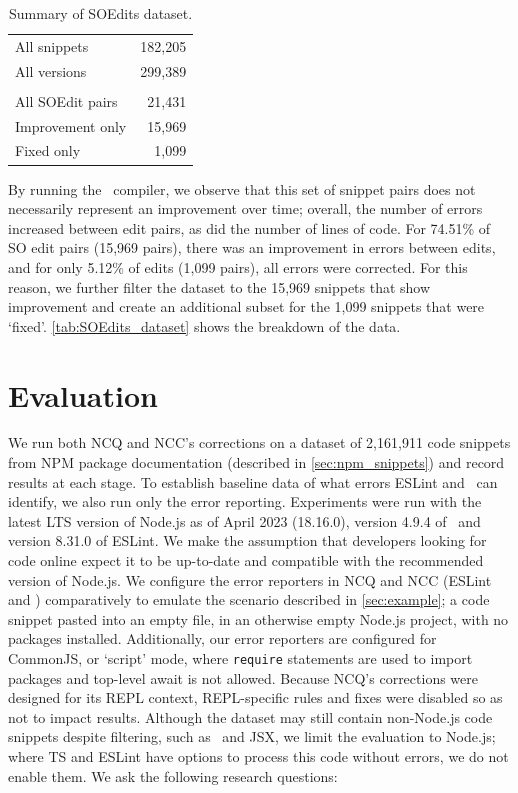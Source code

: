 \documentclass[conference]{IEEEtran}
\begin{document}
\begin{table}[h]
    \centering
    \caption{Summary of SOEdits dataset.}
    \begin{tabular}{l|r}
        \toprule
        All snippets & 182,205 \\
        All versions & 299,389 \\
        \midrule
        &\\
        All SOEdit pairs & 21,431 \\
        Improvement only & 15,969\\
        Fixed only & 1,099\\
        \bottomrule
    \end{tabular}
    \label{tab:SOEdits_dataset}
\end{table}

By running the \ts\ compiler, we observe that this set of snippet pairs does not necessarily represent an improvement over time; overall, the number of errors increased between edit pairs, as did the number of lines of code. For 74.51\% of SO edit pairs (15,969 pairs), there was an improvement in errors between edits, and for only 5.12\% of edits (1,099 pairs), all errors were corrected. For this reason, we further filter the dataset to the 15,969 snippets that show improvement and create an additional subset for the 1,099 snippets that were `fixed'. \autoref{tab:SOEdits_dataset} shows the breakdown of the data.

\section{Evaluation}
\label{sec:eval}

We run both NCQ and NCC's corrections on a dataset of 2,161,911 code snippets from NPM package documentation (described in \autoref{sec:npm_snippets}) and record results at each stage. To establish baseline data of what errors ESLint and \ts\ can identify, we also run only the error reporting. Experiments were run with the latest LTS version of Node.js as of April 2023 (18.16.0), version 4.9.4 of \ts\ and version 8.31.0 of ESLint. We make the assumption that developers looking for code online expect it to be up-to-date and compatible with the recommended version of Node.js. We configure the error reporters in NCQ and NCC (ESLint and \ts{}) comparatively to emulate the scenario described in \autoref{sec:example}; a code snippet pasted into an empty file, in an otherwise empty Node.js project, with no packages installed. Additionally, our error reporters are configured for CommonJS, or `script' mode, where \texttt{require} statements are used to import packages and top-level await is not allowed. Because NCQ's corrections were designed for its REPL context, REPL-specific rules and fixes were disabled so as not to impact results. Although the dataset may still contain non-Node.js code snippets despite filtering, such as \ts\ and JSX, we limit the evaluation to Node.js; where TS and ESLint have options to process this code without errors, we do not enable them. We ask the following research questions:
\end{document}
